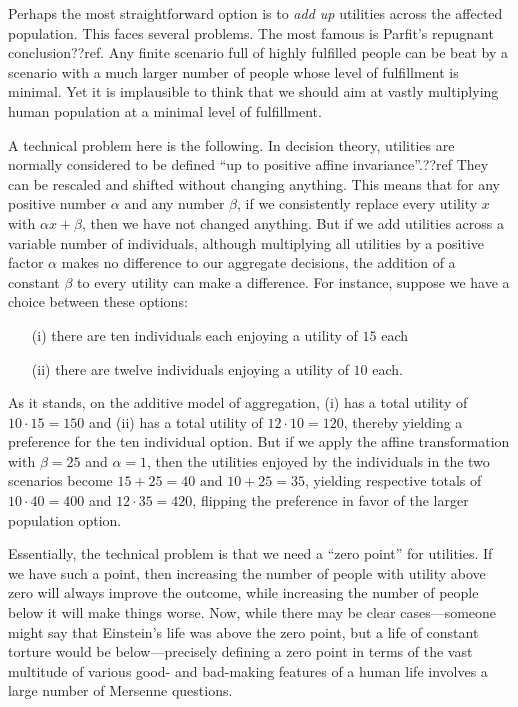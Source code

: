 Perhaps the most straightforward option is to \textit{add up} utilities across the affected population. This faces
several problems. The most famous is Parfit's repugnant conclusion??ref. Any finite scenario full of highly
fulfilled people can be beat by a scenario with a much larger number of people whose level of fulfillment is
minimal. Yet it is implausible to think that we should aim at vastly multiplying human population at a 
minimal level of fulfillment. 

A technical problem here is the following. In decision theory, utilities are normally considered to be defined 
``up to positive affine invariance''.??ref They can be rescaled and shifted without changing anything. This means that for any positive 
number $\alpha$ and any number $\beta$, if we consistently replace every utility $x$ with $\alpha x + \beta$, then 
we have not changed anything. But if we add utilities across a variable number of individuals, although multiplying all
utilities by a positive factor $\alpha$ makes no difference to our aggregate decisions, the addition of 
a constant $\beta$ to every utility can make a difference. For instance, suppose we have a choice between these
options:
\begin{enumerate}
\item[(i)] there are ten individuals
each enjoying a utility of $15$ each
\item[(ii)] there are twelve individuals enjoying a utility of $10$ each. 
\end{enumerate}
As it stands, on
the additive model of aggregation, (i) has a total utility of $10\cdot 15 = 150$ and (ii) has a total utility of $12\cdot 10 = 120$, thereby yielding a preference for the ten individual
option. But if we apply the affine transformation with $\beta = 25$ and $\alpha=1$, then the utilities enjoyed 
by the individuals in the two scenarios become $15+25=40$ and $10+25=35$, yielding respective totals of $10\cdot 40=400$ and 
$12\cdot 35=420$, flipping the preference in favor of the larger population option. 

Essentially, the technical problem is that we need a ``zero point'' for utilities. If we have such a point, then increasing
the number of people with utility above zero will always improve the outcome, while increasing the number of people below it
will make things worse. Now, while there may be clear cases---someone might say that Einstein's life was above the zero 
point, but a life of constant torture would be below---precisely defining a zero point in terms of the vast multitude of various good- and bad-making features of 
a human life involves a large number of Mersenne questions.

